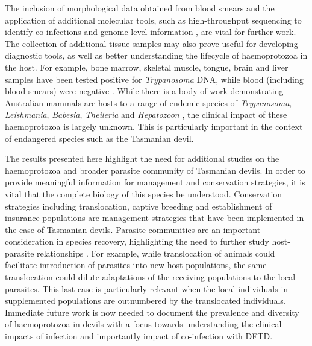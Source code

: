 \documentclass[a4paper, nobind]{templates/ociamthesis}
\begin{document}
The inclusion of morphological data obtained from blood smears and the application of additional molecular tools, such as high-throughput sequencing to identify co-infections \autocite{barbosaIncreasedGeneticDiversity2017} and genome level information \autocite{reis-cunhaWholeGenomeSequencing2018}, are vital for further work. The collection of additional tissue samples may also prove useful for developing diagnostic tools, as well as better understanding the lifecycle of haemoprotozoa in the host. For example, bone marrow, skeletal muscle, tongue, brain and liver samples have been tested positive for \emph{Trypanosoma} DNA, while blood (including blood smears) were negative \autocite{northoverDebilitatingDiseasePolyparasitised2018}. While there is a body of work demonstrating Australian mammals are hosts to a range of endemic species of \emph{Trypanosoma}, \emph{Leishmania}, \emph{Babesia}, \emph{Theileria} and \emph{Hepatozoon} \autocite{austenInvestigationMorphologicalDiversity2015,boteroMorphologicalPhylogeneticDescription2016,barbosaSequenceAnalysesMitochondrial2019,northoverIncreasedTrypanosomaSpp2019}, the clinical impact of these haemoprotozoa is largely unknown. This is particularly important in the context of endangered species such as the Tasmanian devil.

The results presented here highlight the need for additional studies on the haemoprotozoa and broader parasite community of Tasmanian devils. In order to provide meaningful information for management and conservation strategies, it is vital that the complete biology of this species be understood. Conservation strategies including translocation, captive breeding and establishment of insurance populations are management strategies that have been implemented in the case of Tasmanian devils. Parasite communities are an important consideration in species recovery, highlighting the need to further study host-parasite relationships \autocite{northoverHiddenConsequencesAltering2018}. For example, while translocation of animals could facilitate introduction of parasites into new host populations, the same translocation could dilute adaptations of the receiving populations to the local parasites. This last case is particularly relevant when the local individuals in supplemented populations are outnumbered by the translocated individuals. Immediate future work is now needed to document the prevalence and diversity of haemoprotozoa in devils with a focus towards understanding the clinical impacts of infection and importantly impact of co-infection with DFTD.
\end{document}
